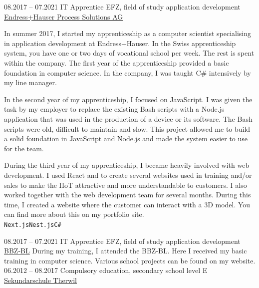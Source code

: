 \documentclass[9pt]{developercv} %
\begin{document}



\begin{entrylist}
	\entry
		{08.2017 -- 07.2021}
		{IT Apprentice EFZ, field of study application development}
		{\href{https://endress.com}{Endress+Hauser Process Solutions AG}}
		{In summer 2017, I started my apprenticeship as a computer scientist specialising in application development at Endress+Hauser. In the Swiss apprenticeship system, you have one or two days of vocational school per week. The rest is spent within the company. The first year of the apprenticeship provided a basic foundation in computer science. In the company, I was taught C\# intensively by my line manager.

    In the second year of my apprenticeship, I focused on JavaScript. I was given the task by my employer to replace the existing Bash scripts with a Node.js application that was used in the production of a device or its software. The Bash scripts were old, difficult to maintain and slow. This project allowed me to build a solid foundation in JavaScript and Node.js and made the system easier to use for the team.
    
    During the third year of my apprenticeship, I became heavily involved with web development. I used React and to create several websites used in training and/or sales to make the IIoT attractive and more understandable to customers. I also worked together with the web development team for several months. During this time, I created a website where the customer can interact with a 3D model. You can find more about this on my portfolio site.\\ \texttt{Next.js}\slashsep\texttt{Nest.js}\slashsep\texttt{C\#}}
\end{entrylist}


\begin{entrylist}
	\entry
		{08.2017 -- 07.2021}
		{IT Apprentice EFZ, field of study application development}
		{\href{https://www.bbzbl.ch/}{BBZ-BL}}
		{During my training, I attended the BBZ-BL. Here I received my basic training in computer science. Various school projects can be found on my website.}
	\entry
		{06.2012 -- 08.2017}
		{Compulsory education, secondary school level E}
		{\href{https://www.sektherwil.ch/}{Sekundarschule Therwil}}
		{}
\end{entrylist}
\pagebreak
\end{document}
